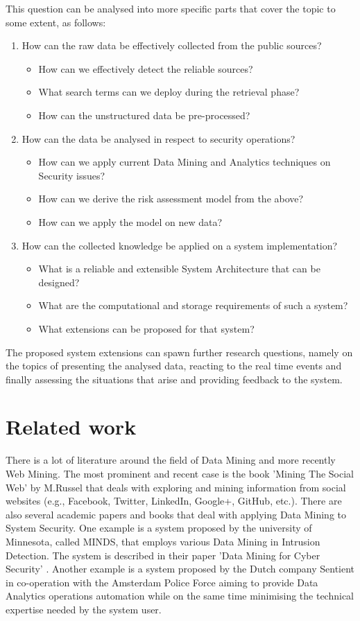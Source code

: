\documentclass[12pt]{article}
\begin{document}
\noindent
This question can be analysed into more specific parts that cover the topic to some extent, as follows:

\begin{enumerate}
	\item How can the raw data be effectively collected from the public sources? 
	\begin{itemize}
		\item How can we effectively detect the reliable sources?
		\item What search terms can we deploy during the retrieval phase?
		\item How can the unstructured data be pre-processed? 
	\end{itemize}
	\item How can the data be analysed in respect to security operations?
	\begin{itemize}
		\item How can we apply current Data Mining and Analytics techniques on Security issues?
		\item How can we derive the risk assessment model from the above?
		\item How can we apply the model on new data?
	\end{itemize}
	\item	How can the collected knowledge be applied on a system implementation?
	\begin{itemize}
		\item What is a reliable and extensible System Architecture that can be designed?
		\item What are the computational and storage requirements of such a system?
		\item What extensions can be proposed for that system?
	\end{itemize}
\end{enumerate}

The proposed system extensions can spawn further research questions, namely on the topics of presenting the analysed data, reacting to the real time events and finally assessing the situations that arise and providing feedback to the system.


\section{Related work}
There is a lot of literature around the field of Data Mining and more recently Web Mining. The most prominent and recent case is the book 'Mining The Social Web' by M.Russel \cite{socialweb} that deals with exploring and mining information from social websites (e.g., Facebook, Twitter, LinkedIn, Google+, GitHub, etc.). There are also several academic papers and books that deal with applying Data Mining to System Security. One example is a system proposed by the university of Minnesota, called MINDS, that employs various Data Mining in Intrusion Detection. The system is described in their paper 'Data Mining for Cyber Security' \cite{minds}.  Another example is a system proposed by the Dutch company Sentient in co-operation with the Amsterdam Police Force \cite{police} aiming to provide Data Analytics operations automation while on the same time minimising the technical expertise needed by the system user. 
\end{document}
